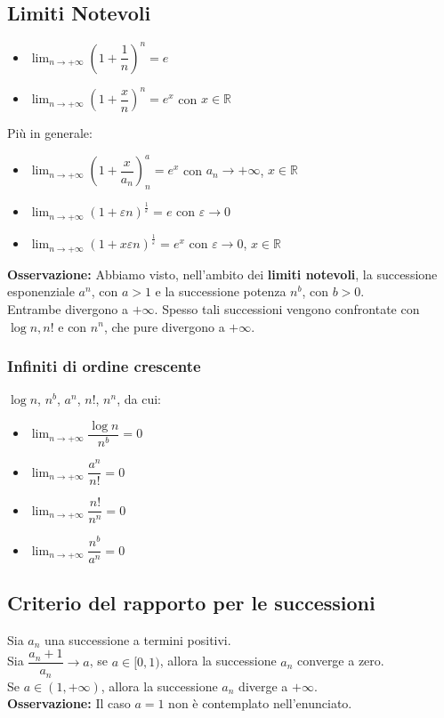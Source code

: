 \documentclass{article}
\newcommand{\R}{\mathbb{R}}
\begin{document}
\subsection{Limiti Notevoli}
\begin{itemize}
    \item $\lim_{n\to+\infty} (1+\dfrac{1}{n})^n = e$
    \item $\lim_{n\to+\infty} (1+\dfrac{x}{n})^n = e^x$ con $x \in \R$
\end{itemize}
Più in generale:
\begin{itemize}
    \item $\lim_{n\to+\infty} (1+\dfrac{x}{a_n})^a_n = e^x$ con $a_n \to +\infty$, $x \in \R$
    \item $\lim_{n\to+\infty} (1+\varepsilon n)^{\frac{1}{\varepsilon}} = e$ con $\varepsilon \to 0$
    \item $\lim_{n\to+\infty} (1+x\varepsilon n)^{\frac{1}{\varepsilon}} = e^x$ con $\varepsilon \to 0$, $x \in \R$
\end{itemize}
\textbf{Osservazione:} Abbiamo visto, nell'ambito dei \textbf{limiti notevoli}, la successione esponenziale $a^n$, con $a > 1$ e la successione potenza $n^b$, con $b > 0$.\\
Entrambe divergono a $+\infty$. Spesso tali successioni vengono confrontate con $\log n, n!$ e con $n^n$, che pure divergono a $+\infty$.\\

\subsubsection{Infiniti di ordine crescente}
$\log n$, $n^b$, $a^n$, $n!$, $n^n$, da cui:
\begin{itemize}
    \item $\lim_{n\to+\infty} \dfrac{\log n}{n^b} = 0$
    \item $\lim_{n\to+\infty} \dfrac{a^n}{n!} = 0$
    \item $\lim_{n\to+\infty} \dfrac{n!}{n^n} = 0$
    \item $\lim_{n\to+\infty} \dfrac{n^b}{a^n} = 0$
\end{itemize}

\subsection{Criterio del rapporto per le successioni}
Sia $a_n$ una successione a termini positivi.\\ Sia $\dfrac{a_n+1}{a_n} \to a$,
se $a \in [0, 1)$, allora la successione $a_n$ converge a zero.\\ Se $a \in (1,
    +\infty)$, allora la successione $a_n$ diverge a $+\infty$.\\
\textbf{Osservazione:} Il caso $a = 1$ non è contemplato nell'enunciato.
\end{document}
